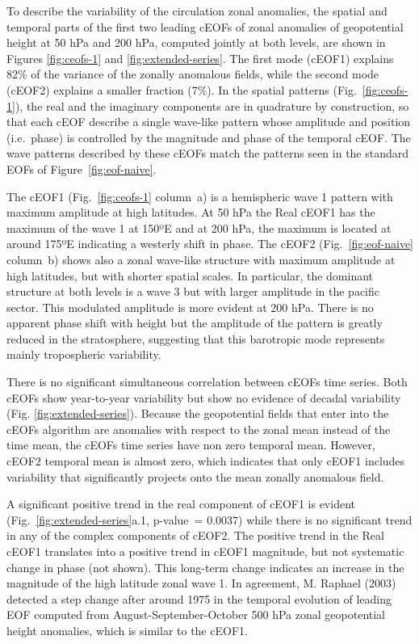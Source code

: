 \documentclass[smallextended]{svjour3}       %
\begin{document}
To describe the variability of the circulation zonal anomalies, the spatial and temporal parts of the first two leading cEOFs of zonal anomalies of geopotential height at 50 hPa and 200 hPa, computed jointly at both levels, are shown in Figures \ref{fig:ceofs-1} and \ref{fig:extended-series}.
The first mode (cEOF1) explains 82\% of the variance of the zonally anomalous fields, while the second mode (cEOF2) explains a smaller fraction (7\%).
In the spatial patterns (Fig.~\ref{fig:ceofs-1}), the real and the imaginary components are in quadrature by construction, so that each cEOF describe a single wave-like pattern whose amplitude and position (i.e.~phase) is controlled by the magnitude and phase of the temporal cEOF.
The wave patterns described by these cEOFs match the patterns seen in the standard EOFs of Figure~\ref{fig:eof-naive}.

The cEOF1 (Fig.~\ref{fig:ceofs-1} column~a) is a hemispheric wave 1 pattern with maximum amplitude at high latitudes.
At 50 hPa the Real cEOF1 has the maximum of the wave 1 at 150ºE and at 200 hPa, the maximum is located at around 175ºE indicating a westerly shift in phase.
The cEOF2 (Fig.~\ref{fig:eof-naive} column~b) shows also a zonal wave-like structure with maximum amplitude at high latitudes, but with shorter spatial scales.
In particular, the dominant structure at both levels is a wave 3 but with larger amplitude in the pacific sector.
This modulated amplitude is more evident at 200 hPa.
There is no apparent phase shift with height but the amplitude of the pattern is greatly reduced in the stratosphere, suggesting that this barotropic mode represents mainly tropospheric variability.

There is no significant simultaneous correlation between cEOFs time series.
Both cEOFs show year-to-year variability but show no evidence of decadal variability (Fig. \ref{fig:extended-series}).
Because the geopotential fields that enter into the cEOFs algorithm are anomalies with respect to the zonal mean instead of the time mean, the cEOFs time series have non zero temporal mean.
However, cEOF2 temporal mean is almost zero, which indicates that only cEOF1 includes variability that significantly projects onto the mean zonally anomalous field.

A significant positive trend in the real component of cEOF1 is evident (Fig.~\ref{fig:extended-series}a.1, p-value~= 0.0037) while there is no significant trend in any of the complex components of cEOF2.
The positive trend in the Real cEOF1 translates into a positive trend in cEOF1 magnitude, but not systematic change in phase (not shown).
This long-term change indicates an increase in the magnitude of the high latitude zonal wave 1.
In agreement, M. Raphael (2003) detected a step change after around 1975 in the temporal evolution of leading EOF computed from August-September-October 500 hPa zonal geopotential height anomalies, which is similar to the cEOF1.
\end{document}
